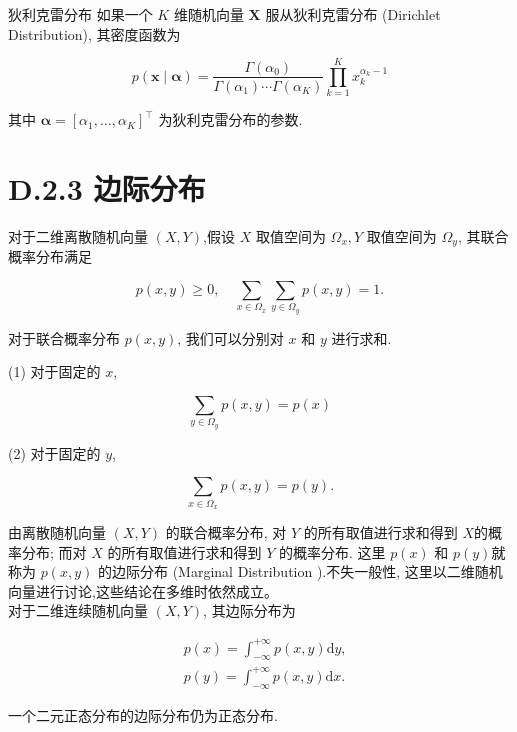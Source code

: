 \documentclass[10pt]{article}
\begin{document}
狄利克雷分布 如果一个 $K$ 维随机向量 $\boldsymbol{X}$ 服从狄利克雷分布 (Dirichlet Distribution), 其密度函数为


\begin{equation*}
p(\boldsymbol{x} \mid \boldsymbol{\alpha})=\frac{\Gamma\left(\alpha_{0}\right)}{\Gamma\left(\alpha_{1}\right) \cdots \Gamma\left(\alpha_{K}\right)} \prod_{k=1}^{K} x_{k}^{\alpha_{k}-1} \tag{D.23}
\end{equation*}


其中 $\boldsymbol{\alpha}=\left[\alpha_{1}, \ldots, \alpha_{K}\right]^{\top}$ 为狄利克雷分布的参数.

\section*{D.2.3 边际分布}
对于二维离散随机向量 $(X, Y)$,假设 $X$ 取值空间为 $\Omega_{x}, Y$ 取值空间为 $\Omega_{y}$, 其联合概率分布满足


\begin{equation*}
p(x, y) \geq 0, \quad \sum_{x \in \Omega_{x}} \sum_{y \in \Omega_{y}} p(x, y)=1 . \tag{D.24}
\end{equation*}


对于联合概率分布 $p(x, y)$, 我们可以分别对 $x$ 和 $y$ 进行求和.

(1) 对于固定的 $x$,


\begin{equation*}
\sum_{y \in \Omega_{y}} p(x, y)=p(x) \tag{D.25}
\end{equation*}


(2) 对于固定的 $y$,


\begin{equation*}
\sum_{x \in \Omega_{x}} p(x, y)=p(y) . \tag{D.26}
\end{equation*}


由离散随机向量 $(X, Y)$ 的联合概率分布, 对 $Y$ 的所有取值进行求和得到 $X$的概率分布; 而对 $X$ 的所有取值进行求和得到 $Y$ 的概率分布. 这里 $p(x)$ 和 $p(y)$就称为 $p(x, y)$ 的边际分布 (Marginal Distribution ).不失一般性, 这里以二维随机向量进行讨论,这些结论在多维时依然成立。\\
对于二维连续随机向量 $(X, Y)$, 其边际分布为


\begin{align*}
& p(x)=\int_{-\infty}^{+\infty} p(x, y) \mathrm{d} y,  \tag{D.27}\\
& p(y)=\int_{-\infty}^{+\infty} p(x, y) \mathrm{d} x . \tag{D.28}
\end{align*}


一个二元正态分布的边际分布仍为正态分布.
\end{document}
